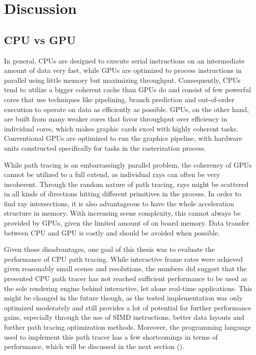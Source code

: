 \section{Discussion}
\label{discussion}
\subsection{CPU vs GPU}
In general, CPUs are designed to execute serial instructions on an intermediate amount of data very fast, while GPUs are optimized to process instructions in parallel using little memory but maximizing throughput. Consequently, CPUs tend to utilize a bigger coherent cache than GPUs do and consist of few powerful cores that use techniques like pipelining, branch prediction and out-of-order execution to operate on data as efficiently as possible. GPUs, on the other hand, are built from many weaker cores that favor throughput over efficiency in individual cores, which makes graphic cards excel with highly coherent tasks. Conventional GPUs are optimized to run the graphics pipeline, with hardware units constructed specifically for tasks in the rasterization process. 

While path tracing is an embarrassingly parallel problem, the coherency of GPUs cannot be utilized to a full extend, as individual rays can often be very incoherent. Through the random nature of path tracing, rays might be scattered in all kinds of directions hitting different primitives in the process. In order to find ray intersections, it is also advantageous to have the whole acceleration structure in memory. With increasing scene complexity, this cannot always be provided by GPUs, given the limited amount of on board memory. Data transfer between CPU and GPU is costly and should be avoided when possible. 

Given those disadvantages, one goal of this thesis was to evaluate the performance of CPU path tracing. While interactive frame rates were achieved given reasonably small scenes and resolutions, the numbers did suggest that the presented CPU path tracer has not reached sufficient performance to be used as the sole rendering engine behind interactive, let alone real-time applications. This might be changed in the future though, as the tested implementation was only optimized moderately and still provides a lot of potential for further performance gains, especially through the use of SIMD instructions, better data layouts and further path tracing optimization methods. Moreover, the programming language used to implement this path tracer has a few shortcomings in terms of performance, which will be discussed in the next section ().

